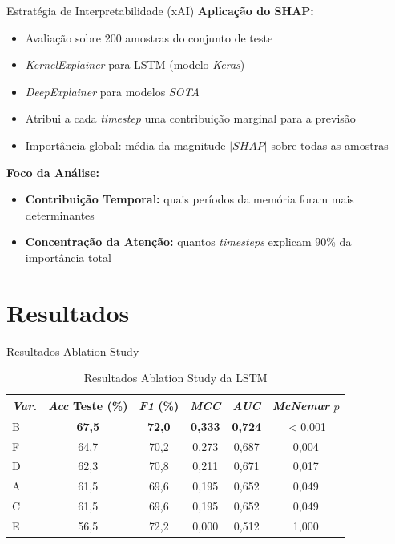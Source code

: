 \documentclass[10pt]{beamer}
\begin{document}
\begin{frame}{Estratégia de Interpretabilidade (xAI)}
\textbf{Aplicação do SHAP:}
\begin{itemize}
    \item Avaliação sobre 200 amostras do conjunto de teste
    \item \textit{KernelExplainer} para LSTM (modelo \textit{Keras})
    \item \textit{DeepExplainer} para modelos \textit{SOTA}
    \item Atribui a cada \textit{timestep} uma contribuição marginal para a previsão
    \item Importância global: média da magnitude $|SHAP|$ sobre todas as amostras
\end{itemize}

\vspace{0.3cm}
\textbf{Foco da Análise:}
\begin{itemize}
    \item \textbf{Contribuição Temporal:} quais períodos da memória foram mais determinantes
    \item \textbf{Concentração da Atenção:} quantos \textit{timesteps} explicam 90\% da importância total
\end{itemize}
\end{frame}

\section{Resultados}

\begin{frame}{Resultados Ablation Study}
\begin{table}
\centering
\caption{Resultados Ablation Study da LSTM}
\begin{tabular}{@{}lccccc@{}}
\toprule
\textbf{\textit{Var.}} & \textbf{\textit{Acc} Teste (\%)} & \textbf{\textit{F1} (\%)} & \textbf{\textit{MCC}} & \textbf{\textit{AUC}} & \textit{McNemar} $p$ \\
\midrule
B & \textbf{67,5} & \textbf{72,0} & \textbf{0,333} & \textbf{0,724} & $<$0,001 \\
F & 64,7 & 70,2 & 0,273 & 0,687 & 0,004 \\
D & 62,3 & 70,8 & 0,211 & 0,671 & 0,017 \\
A & 61,5 & 69,6 & 0,195 & 0,652 & 0,049 \\
C & 61,5 & 69,6 & 0,195 & 0,652 & 0,049 \\
E & 56,5 & 72,2 & 0,000 & 0,512 & 1,000 \\
\bottomrule
\end{tabular}
\end{table}
\end{frame}
\end{document}
